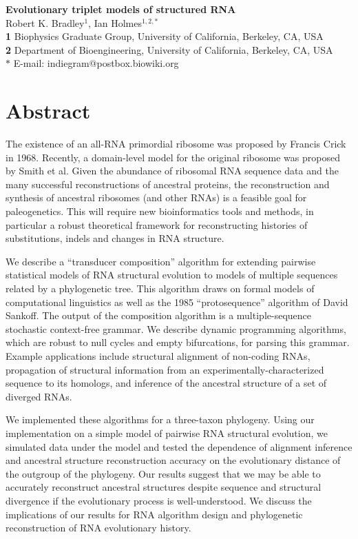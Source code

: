 \documentclass[10pt]{article}
\date{}
\begin{document}
\begin{flushleft}
  {\Large
    \textbf{Evolutionary triplet models of structured RNA}
  }
\\
Robert K. Bradley$^{1}$, 
Ian Holmes$^{1,2,\ast}$
\\
\textbf{1} Biophysics Graduate Group, University of California, Berkeley, CA, USA
\\
\textbf{2} Department of Bioengineering, University of California, Berkeley, CA, USA
\\
$\ast$ E-mail: indiegram@postbox.biowiki.org
\end{flushleft}


\newpage
\section*{Abstract}
The existence of an all-RNA primordial ribosome was proposed by
Francis Crick in 1968.  Recently, a domain-level model for the
original ribosome was proposed by Smith et al.  Given the abundance of
ribosomal RNA sequence data and the many successful reconstructions of
ancestral proteins, the reconstruction and synthesis of ancestral
ribosomes (and other RNAs) is a feasible goal for paleogenetics.  This
will require new bioinformatics tools and methods, in particular a
robust theoretical framework for reconstructing histories of
substitutions, indels and changes in RNA structure.

We describe a ``transducer composition'' algorithm for extending
pairwise statistical models of RNA structural evolution to models of
multiple sequences related by a phylogenetic tree.  This algorithm
draws on formal models of computational linguistics as well as the
1985 ``protosequence'' algorithm of David Sankoff.  The output of the
composition algorithm is a multiple-sequence stochastic context-free
grammar.  We describe dynamic programming algorithms, which are robust
to null cycles and empty bifurcations, for parsing this grammar.
Example applications include structural alignment of non-coding RNAs,
propagation of structural information from an
experimentally-characterized sequence to its homologs, and inference
of the ancestral structure of a set of diverged RNAs.

We implemented these algorithms for a three-taxon phylogeny.  Using
our implementation on a simple model of pairwise RNA structural
evolution, we simulated data under the model and tested the dependence
of alignment inference and ancestral structure reconstruction accuracy on the evolutionary
distance of the outgroup of the phylogeny.  Our results suggest that
we may be able to accurately reconstruct ancestral structures despite
sequence and structural divergence if the evolutionary process is
well-understood.
We discuss the implications of our results for RNA algorithm design
and phylogenetic reconstruction of RNA evolutionary history.
\end{document}

